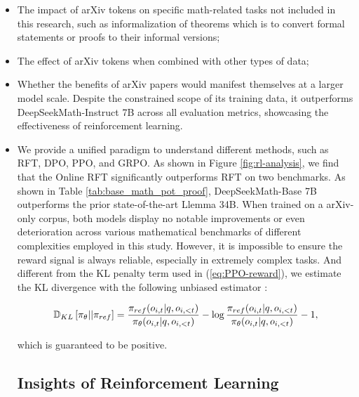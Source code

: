 \begin{algorithm}[t]
\begin{algorithmic}[1]
\begin{itemize}[topsep=0pt]
    \item The impact of arXiv tokens on specific math-related tasks not included in this research, such as informalization of theorems which is to convert formal statements or proofs to their informal versions;
    \item The effect of arXiv tokens when combined with other types of data;
    \item Whether the benefits of arXiv papers would manifest themselves at a larger model scale. Despite the constrained scope of its training data, it outperforms DeepSeekMath-Instruct 7B across all evaluation metrics, showcasing the effectiveness of reinforcement learning. \item We provide a unified paradigm to understand different methods, such as RFT, DPO, PPO, and GRPO. As shown in Figure \ref{fig:rl-analysis},
we find that the Online RFT significantly outperforms RFT on two benchmarks. As shown in Table \ref{tab:base_math_pot_proof}, DeepSeekMath-Base 7B outperforms the prior state-of-the-art Llemma 34B. When trained on a arXiv-only corpus, both models display no notable improvements or even deterioration across various mathematical benchmarks of different complexities employed in this study. However, it is impossible to ensure the reward signal is always reliable, especially in extremely complex tasks. And different from the KL penalty term used in (\ref{eq:PPO-reward}), we estimate the KL divergence with the following unbiased estimator \citep{kl_approx}:

\begin{equation}
\small
    \mathbb{D}_{KL}\left[\pi_{\theta} || \pi_{ref}\right] = \frac{\pi_{ref}(o_{i,t}|q,o_{i,<t})}{\pi_{\theta}(o_{i,t}|q,o_{i,<t})}- \log\frac{\pi_{ref}(o_{i,t}|q,o_{i,<t})}{\pi_{\theta}(o_{i,t}|q,o_{i,<t})} - 1,
\end{equation}

which is guaranteed to be positive. \subsection{Insights of Reinforcement Learning}

\end{itemize}
\end{algorithmic}
\end{algorithm}
